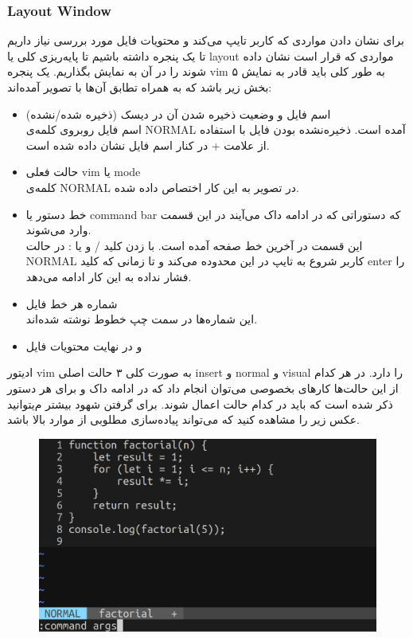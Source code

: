 \subsubsection*{{\titr Layout Window}}

برای نشان دادن مواردی که کاربر تایپ می‌کند و محتویات فایل مورد بررسی نیاز داریم تا یک پنجره داشته باشیم تا پایه‌ریزی کلی یا layout مواردی که قرار است نشان داده شوند را در آن به نمایش بگذاریم. یک پنجره vim به طور کلی باید قادر به نمایش ۵ بخش زیر باشد که به همراه تطابق آن‌ها با تصویر آمده‌اند:

\begin{itemize}
    \item اسم فایل و وضعیت ذخیره شدن آن در دیسک (ذخیره شده/نشده)\\
    اسم فایل روبروی کلمه‌ی NORMAL آمده است. ذخیره‌نشده بودن فایل با استفاده از علامت + در کنار اسم فایل نشان داده شده است.
    \item حالت فعلی vim یا mode\\
    کلمه‌ی NORMAL در تصویر به این کار اختصاص داده شده.
    \item خط دستور یا command bar که دستوراتی که در ادامه داک می‌آیند در این قسمت وارد می‌شوند.\\
    این قسمت در آخرین خط صفحه آمده است. با زدن کلید / و یا : در حالت NORMAL کاربر شروع به تایپ در این محدوده می‌کند و تا زمانی که کلید enter را فشار نداده به این کار ادامه می‌دهد.
    \item شماره هر خط فایل\\
    این شماره‌ها در سمت چپ خطوط نوشته شده‌اند.
    \item و در نهایت محتویات فایل
\end{itemize}

ادیتور vim به صورت کلی ۳ حالت اصلی insert و normal و visual را دارد. در هر کدام از این حالت‌ها کارهای بخصوصی می‌توان انجام داد که در ادامه داک و برای هر دستور ذکر شده است که باید در کدام حالت اعمال شوند. برای گرفتن شهود بیشتر م‌یتوانید عکس زیر را مشاهده کنید که می‌تواند پیاده‌سازی مطلوبی از موارد بالا باشد.

\begin{figure}[H]
    \centerline{\includegraphics[width=\textwidth]{Resources/window_layout.png}}
\end{figure}

